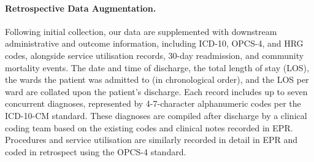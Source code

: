 \documentclass[fleqn,10pt]{wlscirep}
\begin{document}
\paragraph{Retrospective Data Augmentation.} Following initial collection, our data are supplemented with downstream administrative and outcome information, including ICD-10, OPCS-4, and HRG codes, alongside service utilisation records, 30-day readmission, and community mortality events. The date and time of discharge, the total length of stay (LOS), the wards the patient was admitted to (in chronological order), and the LOS per ward are collated upon the patient’s discharge. Each record includes up to seven concurrent diagnoses, represented by 4-7-character alphanumeric codes per the ICD-10-CM standard. These diagnoses are compiled after discharge by a clinical coding team based on the existing codes and clinical notes recorded in EPR. Procedures and service utilisation are similarly recorded in detail in EPR and coded in retrospect using the OPCS-4 standard.
\end{document}
